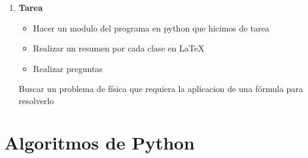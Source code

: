\documentclass{book}
\begin{document}
\begin{enumerate}
\begin{enumerate}
\begin{enumerate}
		\end{enumerate}
		
	\end{enumerate}
	\item \textbf{Tarea}
	\begin{itemize}
		\item Hacer un modulo del programa en python que hicimos de tarea
		\item Realizar un resumen por cada clase en LaTeX
		\item Realizar preguntas
		
	\end{itemize}
	Buscar un problema de física que requiera la aplicacion de una fórmula para resolverlo
	
	
\end{enumerate}%


\section{Algoritmos de Python\\}%
\begin{flushright}
	\date{14 de enero de 2019}
\end{flushright}
\end{document}
